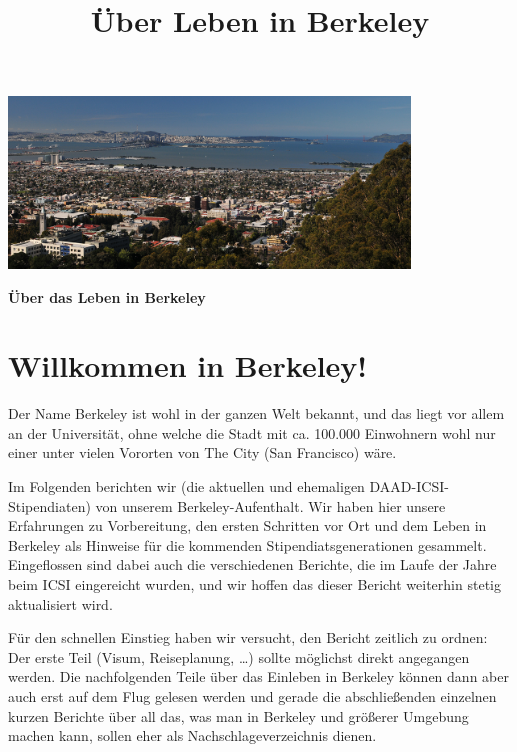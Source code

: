 \documentclass[a4paper]{scrreprt}
\begin{document}
\title{Über Leben in Berkeley}

\begin{center}

\vspace{0.4\textwidth}
\includegraphics[width=0.8\textwidth]{img/berkeley_cropped.jpg}

\vspace{0.1\textwidth}

\Huge{\textbf{Über das Leben in Berkeley}}

\end{center}

\newpage

\section*{Willkommen in Berkeley!}

Der Name Berkeley ist wohl in der ganzen Welt bekannt, und das liegt vor allem an der Universität, 
ohne welche die Stadt mit ca. 100.000 Einwohnern wohl nur einer unter vielen Vororten von The City (San Francisco) wäre.

Im Folgenden berichten wir (die aktuellen und ehemaligen DAAD-ICSI-Stipendiaten) von unserem Berkeley-Aufenthalt.
Wir haben hier unsere Erfahrungen zu Vorbereitung, den ersten Schritten vor Ort und dem Leben in Berkeley
als Hinweise für die kommenden Stipendiatsgenerationen gesammelt.
Eingeflossen sind dabei auch die verschiedenen Berichte,
die im Laufe der Jahre beim ICSI eingereicht wurden,
und wir hoffen das dieser Bericht weiterhin stetig aktualisiert wird.

Für den schnellen Einstieg haben wir versucht, den Bericht zeitlich zu ordnen: 
Der erste Teil (Visum, Reiseplanung, \ldots) sollte möglichst direkt angegangen werden.
Die nachfolgenden Teile über das Einleben in Berkeley können dann aber auch erst auf dem Flug gelesen werden
und gerade die abschließenden einzelnen kurzen Berichte über all das, was man in Berkeley
und größerer Umgebung machen kann, sollen eher als Nachschlageverzeichnis dienen.
\end{document}
